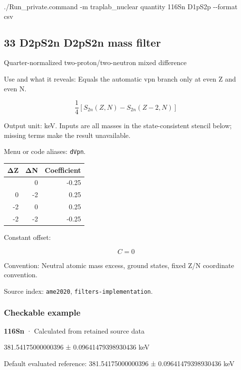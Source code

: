 \documentclass[
  11pt,
  letterpaper,
]{article}
\newenvironment{Shaded}{}{}
\newcommand{\AttributeTok}[1]{\textcolor[rgb]{0.49,0.56,0.16}{#1}}
\newcommand{\ExtensionTok}[1]{#1}
\newcommand{\NormalTok}[1]{#1}
\begin{document}
\begin{Shaded}
\begin{Highlighting}[]
\ExtensionTok{./Run\_private.command} \AttributeTok{{-}m}\NormalTok{ traplab\_nuclear quantity 116Sn D1pS2p }\AttributeTok{{-}{-}format}\NormalTok{ csv}
\end{Highlighting}
\end{Shaded}

\subsection{33 D2pS2n D2pS2n mass
filter}\label{d2ps2n-d2ps2n-mass-filter}

Quarter-normalized two-proton/two-neutron mixed difference

Use and what it reveals: Equals the automatic vpn branch only at even Z
and even N.

\[
\frac14[S_{2n}(Z,N)-S_{2n}(Z-2,N)]
\]

Output unit: keV. Inputs are all masses in the state-consistent stencil
below; missing terms make the result unavailable.

Menu or code aliases: \texttt{dVpn}.

\begin{longtable}[]{@{}rrr@{}}
\toprule\noalign{}
ΔZ & ΔN & Coefficient \\
\midrule\noalign{}
\endhead
\bottomrule\noalign{}
\endlastfoot
0 & 0 & -0.25 \\
0 & -2 & 0.25 \\
-2 & 0 & 0.25 \\
-2 & -2 & -0.25 \\
\end{longtable}

Constant offset:

\[
C=0
\]

Convention: Neutral atomic mass excess, ground states, fixed Z/N
coordinate convention.

Source index: \texttt{ame2020}, \texttt{filters-implementation}.

\subsubsection{Checkable example}\label{checkable-example-32}

\textbf{116Sn} · Calculated from retained source data

381.54175000000396 ± 0.09641479398930436 keV

Default evaluated reference: 381.54175000000396 ± 0.09641479398930436
keV
\end{document}
